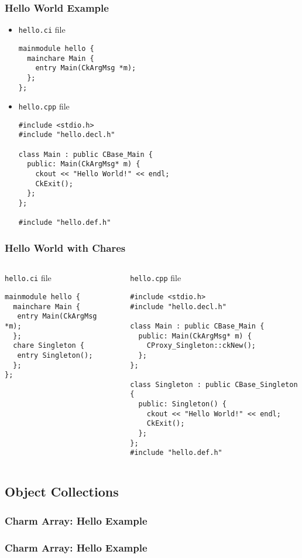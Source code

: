 \begin{frame}[fragile]
   \frametitle{Hello World Example}\scriptsize
\begin{itemize}
\item \texttt{hello.ci} file
   \begin{lstlisting}
mainmodule hello {
  mainchare Main {
    entry Main(CkArgMsg *m);
  };
};
   \end{lstlisting}
\item \texttt{hello.cpp} file
\lstset{basicstyle=\footnotesize}
   \begin{lstlisting}
#include <stdio.h>
#include "hello.decl.h"

class Main : public CBase_Main {
  public: Main(CkArgMsg* m) {
    ckout << "Hello World!" << endl;
    CkExit();
  };
};

#include "hello.def.h"
   \end{lstlisting}
\end{itemize}
\end{frame}

\begin{frame}[fragile]
   \frametitle{Hello World with Chares}\scriptsize
\begin{columns}
\begin{column}{.45\linewidth}
\texttt{hello.ci} file
   \begin{lstlisting}
mainmodule hello {
  mainchare Main { 
   entry Main(CkArgMsg *m); 
  };
  chare Singleton {
   entry Singleton();
  };
};
   \end{lstlisting}
\end{column}
\begin{column}{.55\linewidth}
\texttt{hello.cpp} file
\begin{lstlisting}
#include <stdio.h>
#include "hello.decl.h"

class Main : public CBase_Main {
  public: Main(CkArgMsg* m) {
    CProxy_Singleton::ckNew();
  };
};

class Singleton : public CBase_Singleton {
  public: Singleton() {
    ckout << "Hello World!" << endl;
    CkExit();
  };
};
#include "hello.def.h"
\end{lstlisting}
\end{column}
\end{columns}
\end{frame}

\subsection[Collections]{Object Collections}


\begin{frame}[fragile]
  \frametitle{Charm Array: Hello Example }
  
\end{frame}

\begin{frame}[fragile]
  \frametitle{Charm Array: Hello Example }
  
\end{frame}


